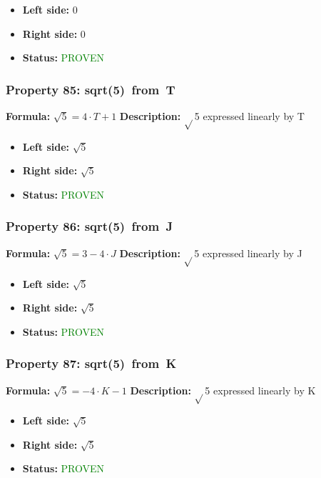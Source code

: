 \begin{itemize}
\item \textbf{Left side:} $0$
\item \textbf{Right side:} $0$
\item \textbf{Status:} \textcolor{green}{PROVEN}
\end{itemize}

\subsubsection*{Property 85: sqrt(5)~from~T}
\textbf{Formula:} $\sqrt{5} = 4 \cdot T + 1$
\textbf{Description:} $\sqrt{}$5 expressed linearly by T

\begin{itemize}
\item \textbf{Left side:} $\sqrt{5}$
\item \textbf{Right side:} $\sqrt{5}$
\item \textbf{Status:} \textcolor{green}{PROVEN}
\end{itemize}

\subsubsection*{Property 86: sqrt(5)~from~J}
\textbf{Formula:} $\sqrt{5} = 3 - 4 \cdot J$
\textbf{Description:} $\sqrt{}$5 expressed linearly by J

\begin{itemize}
\item \textbf{Left side:} $\sqrt{5}$
\item \textbf{Right side:} $\sqrt{5}$
\item \textbf{Status:} \textcolor{green}{PROVEN}
\end{itemize}

\subsubsection*{Property 87: sqrt(5)~from~K}
\textbf{Formula:} $\sqrt{5} = -4 \cdot K - 1$
\textbf{Description:} $\sqrt{}$5 expressed linearly by K

\begin{itemize}
\item \textbf{Left side:} $\sqrt{5}$
\item \textbf{Right side:} $\sqrt{5}$
\item \textbf{Status:} \textcolor{green}{PROVEN}
\end{itemize}

